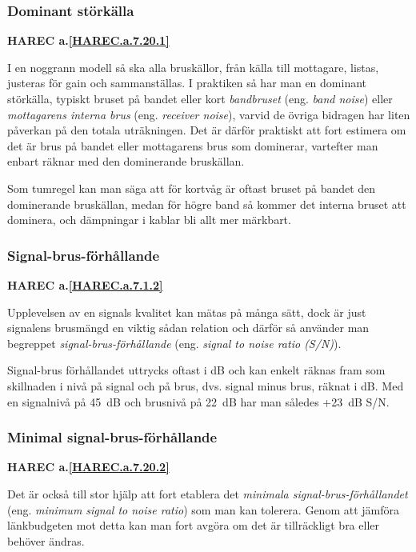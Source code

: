 \subsubsection{Dominant störkälla}
\textbf{HAREC a.\ref{HAREC.a.7.20.1}\label{myHAREC.a.7.20.1}}

I en noggrann modell så ska alla bruskällor, från källa till mottagare,
listas, justeras för gain och sammanställas.
I praktiken så har man en dominant störkälla, typiskt bruset på bandet eller
kort \emph{bandbruset} (eng. \emph{band noise}) eller
\emph{mottagarens interna brus} (eng. \emph{receiver noise}),
varvid de övriga bidragen har liten påverkan på den totala uträkningen.
Det är därför praktiskt att fort estimera om det är brus på bandet eller
mottagarens brus som dominerar, vartefter man enbart räknar med den
dominerande bruskällan.

Som tumregel kan man säga att för kortvåg är oftast bruset på bandet
den dominerande bruskällan, medan för högre band så kommer det interna
bruset att dominera, och dämpningar i kablar bli allt mer märkbart.

\subsubsection{Signal-brus-förhållande}
\textbf{HAREC a.\ref{HAREC.a.7.1.2}\label{myHAREC.a.7.1.2}}

Upplevelsen av en signals kvalitet kan mätas på många sätt, dock är just
signalens brusmängd en viktig sådan relation och därför så använder man
begreppet \emph{signal-brus-förhållande} (eng.
\emph{signal to noise ratio (S/N)}).

Signal-brus förhållandet uttrycks oftast i dB och kan enkelt räknas fram som
skillnaden i nivå på signal och på brus, dvs. signal minus brus, räknat i dB.
Med en signalnivå på 45~dB och brusnivå på 22~dB har man således +23~dB S/N.

\subsubsection{Minimal signal-brus-förhållande}
\textbf{HAREC a.\ref{HAREC.a.7.20.2}\label{myHAREC.a.7.20.2}}

Det är också till stor hjälp att fort etablera det \emph{minimala
signal-brus-förhållandet} (eng. \emph{minimum signal to noise ratio})
som man kan tolerera.
Genom att jämföra länkbudgeten mot detta kan man fort avgöra om det är
tillräckligt bra eller behöver ändras.

